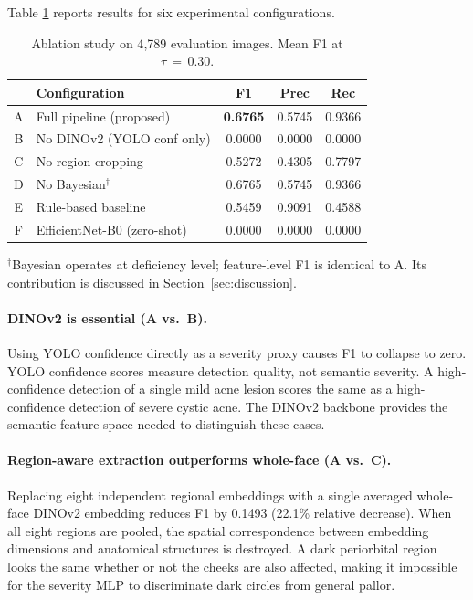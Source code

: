 \documentclass[journal]{IEEEtran}
\begin{document}
Table \ref{tab:ablation} reports results for six experimental configurations.

\begin{table}[h]
\centering
\caption{Ablation study on 4{,}789 evaluation images. Mean F1 at $\tau\,=\,0.30$.}
\label{tab:ablation}
\begin{tabular}{clccc}
\toprule
 & \textbf{Configuration} & \textbf{F1} & \textbf{Prec} & \textbf{Rec} \\
\midrule
A & Full pipeline (proposed)    & \textbf{0.6765} & 0.5745 & 0.9366 \\
B & No DINOv2 (YOLO conf only)  & 0.0000 & 0.0000 & 0.0000 \\
C & No region cropping          & 0.5272 & 0.4305 & 0.7797 \\
D & No Bayesian$^\dagger$       & 0.6765 & 0.5745 & 0.9366 \\
\midrule
E & Rule-based baseline         & 0.5459 & 0.9091 & 0.4588 \\
F & EfficientNet-B0 (zero-shot) & 0.0000 & 0.0000 & 0.0000 \\
\bottomrule
\end{tabular}

\smallskip
\raggedright\footnotesize{$^\dagger$Bayesian operates at deficiency level;
feature-level F1 is identical to A. Its contribution is discussed in
Section~\ref{sec:discussion}.}
\end{table}

\paragraph{DINOv2 is essential (A vs.\ B).}
Using YOLO confidence directly as a severity proxy causes F1 to collapse
to zero. YOLO confidence scores measure detection quality, not semantic severity.
A high-confidence detection of a single mild acne lesion scores the same as a
high-confidence detection of severe cystic acne. The DINOv2 backbone provides
the semantic feature space needed to distinguish these cases.

\paragraph{Region-aware extraction outperforms whole-face (A vs.\ C).}
Replacing eight independent regional embeddings with a single averaged
whole-face DINOv2 embedding reduces F1 by 0.1493 (22.1\% relative decrease).
When all eight regions are pooled, the spatial correspondence between embedding
dimensions and anatomical structures is destroyed. A dark periorbital region
looks the same whether or not the cheeks are also affected, making it impossible
for the severity MLP to discriminate dark circles from general pallor.
\end{document}

